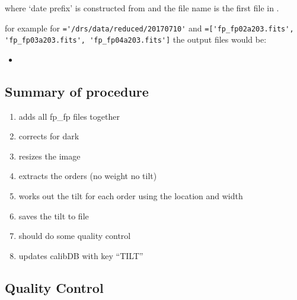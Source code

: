 \noindent where `date prefix' is constructed from \argnightname and the file name is the first file in \argfilenames.

\noindent for example for \reduceddir\lstinline[style=pythoninline]|='/drs/data/reduced/20170710'| and \argfilenames\lstinline[style=pythoninline]|=['fp_fp02a203.fits', 'fp_fp03a203.fits', 'fp_fp04a203.fits']| the output files would be:
\begin{tcustomdir}
\begin{itemize}
\item {}
\end{itemize}
\end{tcustomdir}

\subsection{Summary of procedure}
\begin{enumerate}
\item adds all fp\_fp files together
\item corrects for dark
\item resizes the image
\item extracts the orders (no weight no tilt)
\item works out the tilt for each order using the location and width
\item saves the tilt to file
\item should do some quality control
\item  updates calibDB with key ``TILT''
\end{enumerate}


\subsection{Quality Control}

